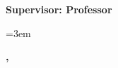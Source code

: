 \begin{titlepage}
\thispagestyle{empty}
\begin{center}

\vspace*{10mm}

{\fontsize{18pt}{22pt}\selectfont\bfseries
  \DegreeType\par}
\vspace{6mm}
{\fontsize{18pt}{22pt}\selectfont\bfseries
  Supervisor: Professor \AdvisorEN\par}

\vspace{28mm}

{\fontsize{21pt}{28pt}\selectfont\bfseries\itshape
  \begin{minipage}{\textwidth}
    \centering
    \sloppy\emergencystretch=3em
    \ThesisTitleEN\par
  \end{minipage}\par}

\vspace{22mm}

{\fontsize{18pt}{26pt}\selectfont\bfseries
  \begin{minipage}{0.85\textwidth}
    \centering
    \SubmissionStatement
  \end{minipage}\par}

\vspace{8mm}

{\fontsize{14pt}{18pt}\selectfont\bfseries
  \SubmissionMonth, \SubmissionYear\par}

\vfill

{\fontsize{18pt}{22pt}\selectfont\bfseries \AuthorEN\par}
\vspace{8mm}
{\fontsize{14pt}{18pt}\selectfont\bfseries \MajorEN\par}
\vspace{3mm}
{\fontsize{14pt}{18pt}\selectfont\bfseries \DepartmentEN\par}
\vspace{8mm}
{\fontsize{18pt}{22pt}\selectfont\bfseries \GraduateSchoolEN\par}

\vspace*{15mm}

\end{center}
\end{titlepage}
